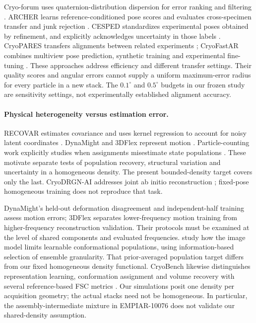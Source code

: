 Cryo-forum uses quaternion-distribution dispersion for error ranking and filtering \citep{cryoforum2023}. ARCHER learns reference-conditioned pose scores and evaluates cross-specimen transfer and junk rejection \citep{archer2026}. CESPED standardizes experimental poses obtained by refinement, and explicitly acknowledges uncertainty in those labels \citep{cesped2024}. CryoPARES transfers alignments between related experiments \citep{cryopares2026}; CryoFastAR combines multiview pose prediction, synthetic training and experimental fine-tuning \citep{cryofastar2025}. These approaches address efficiency and different transfer settings. Their quality scores and angular errors cannot supply a uniform maximum-error radius for every particle in a new stack. The $0.1^\circ$ and $0.5^\circ$ budgets in our frozen study are sensitivity settings, not experimentally established alignment accuracy.

\paragraph{Physical heterogeneity versus estimation error.} RECOVAR estimates covariance and uses kernel regression to account for noisy latent coordinates \citep{recovar2025}. DynaMight and 3DFlex represent motion \citep{dynamight2024,flex2023}. Particle-counting work explicitly studies when assignments misestimate state populations \citep{counting2026}. These motivate separate tests of population recovery, structural variation and uncertainty in a homogeneous density. The present bounded-density target covers only the last. CryoDRGN-AI addresses joint ab initio reconstruction \citep{drgnai2025}; fixed-pose homogeneous training does not reproduce that task.

DynaMight's held-out deformation disagreement and independent-half training assess motion errors; 3DFlex separates lower-frequency motion training from higher-frequency reconstruction validation. Their protocols must be examined at the level of shared components and evaluated frequencies. \citet{mattingly2026} study how the image model limits learnable conformational populations, using information-based selection of ensemble granularity. That prior-averaged population target differs from our fixed homogeneous density functional. CryoBench likewise distinguishes representation learning, conformation assignment and volume recovery with several reference-based FSC metrics \citep{cryobench2025}. Our simulations posit one density per acquisition geometry; the actual stacks need not be homogeneous. In particular, the assembly-intermediate mixture in EMPIAR-10076 does not validate our shared-density assumption.

